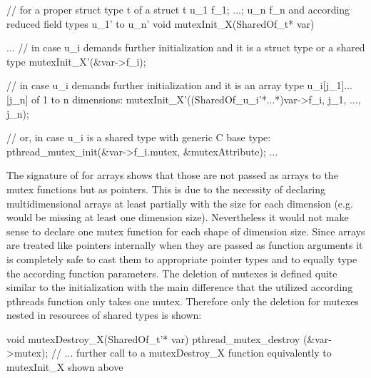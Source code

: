 \begin{ccode}
// for a proper struct type t of a struct t { u_1 f_1; ...; u_n f_n } and according reduced field types u_1' to u_n'
void mutexInit_X(SharedOf_t* var) {
  ...
  // in case u_i demands further initialization and it is a struct type or a shared type
  mutexInit_X'(&var->f_i);
  
  // in case u_i demands further initialization and it is an array type u_i[j_1]...[j_n] of 1 to n dimensions:
  mutexInit_X'((SharedOf_u_i'*...*)var->f_i, j_1, ..., j_n);
  
  // or, in case u_i is a shared type with generic C base type:
  pthread_mutex_init(&var->f_i.mutex, &mutexAttribute);
  ...
}
\end{ccode}
The signature of  for arrays shows that those are not passed as arrays to the mutex functions but as pointers. This is due to the necessity of declaring multidimensional arrays at least partially with the size for each dimension (e.g.  would be missing at least one dimension size). Nevertheless it would not make sense to declare one mutex function for each shape of dimension size. Since arrays are treated like pointers internally when they are passed as function arguments it is completely safe to cast them to appropriate pointer types and to equally type the according function parameters.
The deletion of mutexes is defined quite similar to the initialization with the main difference that the utilized according pthreads function only takes one mutex. Therefore only the deletion for mutexes nested in resources of shared types is shown:
\begin{ccode}
void mutexDestroy_X(SharedOf_t'* var) { 
  pthread_mutex_destroy (&var->mutex); 
  // ... further call to a mutexDestroy_X function equivalently to mutexInit_X shown above
}
\end{ccode}
